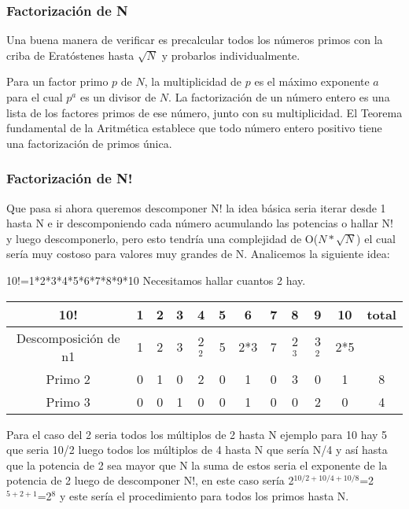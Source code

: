 \subsubsection{Factorización de N}

Una buena manera de verificar es precalcular todos los números primos con la criba de Eratóstenes hasta $\sqrt{N}$ y probarlos individualmente.

Para un factor primo $p$ de $N$, la multiplicidad de $p$ es el máximo exponente $a$ para el cual $p^a$ es un divisor de $N$. La factorización de un número entero es una lista de los factores primos de ese número, junto con su multiplicidad. El Teorema fundamental de la Aritmética establece que todo número entero positivo tiene una factorización de primos única.

\subsubsection{Factorización de N!}

Que pasa si ahora queremos descomponer N! la idea básica seria iterar desde 1 hasta N e ir descomponiendo cada número acumulando las potencias o hallar N! y luego descomponerlo, pero esto tendría una complejidad de O($N* \sqrt{N}$) el cual sería muy costoso para valores muy grandes de N. Analicemos la siguiente idea:

10!=1*2*3*4*5*6*7*8*9*10 Necesitamos hallar cuantos 2 hay.

\begin{tabular}{|c|c|c|c|c|c|c|c|c|c|c|c|}
	\hline 
	10!& 1 & 2 & 3 & 4 & 5 & 6 & 7 & 8 & 9 & 10 & total \\ 
	\hline 
	Descomposición de n1& 1 & 2 & 3 & 2$^{2}$ & 5 & 2*3 & 7 & 2$^{3}$ & 3$^{2}$ & 2*5 &  \\ 
	\hline 
	Primo 2& 0 & 1 & 0 & 2 & 0 & 1 & 0 & 3 & 0 & 1 & 8 \\ 
	\hline 
	Primo 3& 0 & 0 & 1 & 0 & 0 & 1 & 0 & 0 & 2 & 0 & 4 \\ 
	\hline 
\end{tabular} 

\hspace{0.5em}

Para el caso del 2 seria todos los múltiplos de 2 hasta N ejemplo para 10 hay 5 que seria 10/2 luego todos los múltiplos de 4 hasta N que sería N/4 y así hasta que la potencia de 2 sea mayor que N la suma de estos seria el exponente de la potencia de 2 luego de descomponer N!, en  este caso sería 2$^{10/2+10/4+10/8}$=2$^{5+2+1}$=2$^{8}$ y este sería el procedimiento para todos los primos hasta N.

